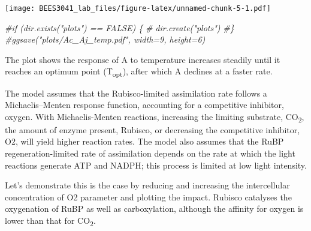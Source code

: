 \documentclass[]{article}
\newenvironment{Shaded}{\begin{snugshade}}{\end{snugshade}}
\newcommand{\CommentTok}[1]{\textcolor[rgb]{0.56,0.35,0.01}{\textit{#1}}}
\begin{document}
\texttt{[image: BEES3041\_lab\_files/figure-latex/unnamed-chunk-5-1.pdf]}

\begin{Shaded}
\begin{Highlighting}[]
\CommentTok{#if (dir.exists("plots") == FALSE) \{}
\CommentTok{#  dir.create("plots")}
\CommentTok{#\}}
\CommentTok{#ggsave("plots/Ac_Aj_temp.pdf", width=9, height=6) }
\end{Highlighting}
\end{Shaded}

The plot shows the response of A to temperature increases steadily until
it reaches an optimum point (T\textsubscript{opt}), after which A
declines at a faster rate.

The model assumes that the Rubisco-limited assimilation rate follows a
Michaelis--Menten response function, accounting for a competitive
inhibitor, oxygen. With Michaelis-Menten reactions, increasing the
limiting substrate, CO\textsubscript{2}, the amount of enzyme present,
Rubisco, or decreasing the competitive inhibitor, O2, will yield higher
reaction rates. The model also assumes that the RuBP
regeneration-limited rate of assimilation depends on the rate at which
the light reactions generate ATP and NADPH; this process is limited at
low light intensity.

Let's demonstrate this is the case by reducing and increasing the
intercellular concentration of O2 parameter and plotting the impact.
Rubisco catalyses the oxygenation of RuBP as well as carboxylation,
although the affinity for oxygen is lower than that for
CO\textsubscript{2}.
\end{document}
